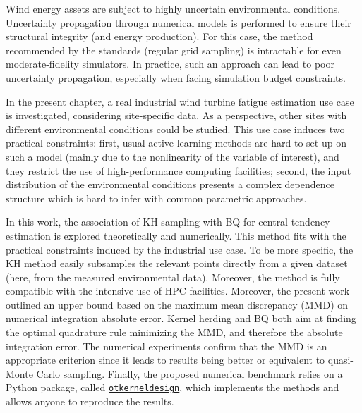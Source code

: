 Wind energy assets are subject to highly uncertain environmental conditions. 
Uncertainty propagation through numerical models is performed to ensure their structural integrity (and energy production). 
For this case, the method recommended by the standards (regular grid sampling) is intractable for even moderate-fidelity simulators. 
In practice, such an approach can lead to poor uncertainty propagation, especially when facing simulation budget constraints.

In the present chapter, a real industrial wind turbine fatigue estimation use case is investigated, considering site-specific data. 
As a perspective, other sites with different environmental conditions could be studied. 
This use case induces two practical constraints: first, usual active learning methods are hard to set up on such a model (mainly due to the nonlinearity of the variable of interest), and they restrict the use of high-performance computing facilities; second, the input distribution of the environmental conditions presents a complex dependence structure which is hard to infer with common parametric approaches. 

In this work, the association of KH sampling with BQ for central tendency estimation is explored theoretically and numerically. 
This method fits with the practical constraints induced by the industrial use case. 
To be more specific, the KH method easily subsamples the relevant points directly from a given dataset (here, from the measured environmental data). 
Moreover, the method is fully compatible with the intensive use of HPC facilities. 
Moreover, the present work outlined an upper bound based on the maximum mean discrepancy (MMD) on numerical integration absolute error. 
Kernel herding and BQ both aim at finding the optimal quadrature rule minimizing the MMD, and therefore the absolute integration error. 
The numerical experiments confirm that the MMD is an appropriate criterion since it leads to results being better or equivalent to quasi-Monte Carlo sampling. 
Finally, the proposed numerical benchmark relies on a Python package, called \texttt{\href{https://efekhari27.github.io/otkerneldesign/master/index.html}{otkerneldesign}}, which implements the methods and allows anyone to reproduce the results. 


